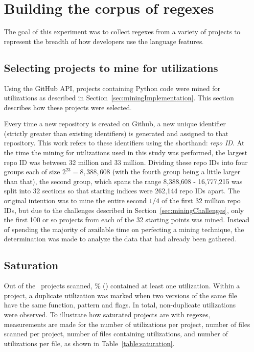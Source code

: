 \section{Building the corpus of regexes}
\label{sec:corpusBuilding}

The goal of this experiment was to collect regexes from a variety of projects to represent the breadth of how developers use the language features.

\subsection{Selecting projects to mine for utilizations}
Using the GitHub API,  projects containing Python code were mined for utilizations as described in Section~\ref{sec:miningImplementation}.  This section describes how these projects were selected.

Every time a new repository is created on Github, a new unique identifier (strictly greater than existing identifiers) is generated and assigned to that repository.  This work refers to these identifiers using the shorthand: \emph{repo ID}.  At the time the mining for utilizations used in this study was performed, the largest repo ID was between 32 million and 33 million.  Dividing these repo IDs into four groups each of size $2^23 = 8,388,608$ (with the fourth group being a little larger than that), the second group, which spans the range 8,388,608 - 16,777,215 was split into 32 sections so that starting indices were 262,144 repo IDs apart.  The original intention was to mine the entire second $1/4$ of the first 32 million repo IDs, but due to the challenges described in Section~\ref{sec:miningChallenges}, only the first 100 or so projects from each of the 32 starting points was mined.  Instead of spending the majority of available time on perfecting a mining technique, the determination was made to analyze the data that had already been gathered.



\subsection{Saturation}
Out of the \ projects scanned, \% () contained at least one utilization.  Within a project, a duplicate utilization was marked when two versions of the same file have the same function, pattern and flags.  In total,  non-duplicate utilizations were observed.  To illustrate how saturated projects are with regexes, measurements are made for the number of utilizations per project, number of files scanned per project, number of files containing utilizations, and number of utilizations  per file, as shown in Table~\ref{table:saturation}.

